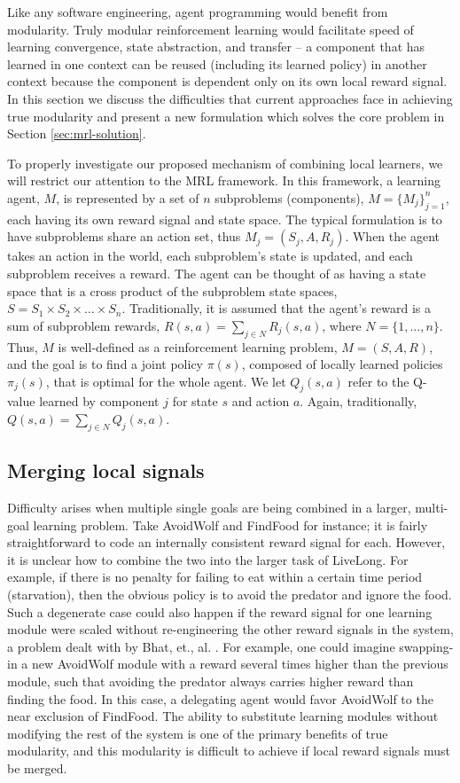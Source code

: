 Like any software engineering, agent programming would benefit from modularity.  Truly modular reinforcement learning would facilitate speed of learning convergence, state abstraction, and transfer -- a component that has learned in one context can be reused (including its learned policy) in another context because the component is dependent only on its own local reward signal.  In this section we discuss the difficulties that current approaches face in achieving true modularity and present a new formulation which solves the core problem in Section \ref{sec:mrl-solution}.

To properly investigate our proposed mechanism of combining local learners, we will restrict our attention to the MRL framework. In this framework, a learning agent, $M$, is represented by a set of $n$ subproblems (components), $M=\{M_j\}_{j=1}^n$, each having its own reward signal and state space. The typical formulation is to have subproblems share an action set, thus $M_j = (S_j,A,R_j)$. When the agent takes an action in the world, each subproblem's state is updated, and each subproblem receives a reward. The agent can be thought of as having a state space that is a cross product of the subproblem state spaces, $S=S_1\times S_2\times\ldots\times S_n$. Traditionally, it is assumed that the agent's reward is a sum of subproblem rewards, $R(s,a)=\sum_{j\in N} R_j(s,a)$, where $N=\{1,\ldots,n\}$. Thus, $M$ is well-defined as a reinforcement learning problem, $M=(S,A,R)$, and the goal is to find a joint policy $\pi(s)$, composed of locally learned policies $\pi_j(s)$, that is optimal for the whole agent. We let $Q_j(s,a)$ refer to the Q-value learned by component $j$ for state $s$ and action $a$. Again, traditionally, $Q(s,a)=\sum_{j\in N} Q_j(s,a)$.

\subsection{Merging local signals}

Difficulty arises when multiple single goals are being combined in a larger, multi-goal learning problem. Take AvoidWolf and FindFood for instance; it is fairly straightforward to code an internally consistent reward signal for each.  However, it is unclear how to combine the two into the larger task of LiveLong.  For example, if there is no penalty for failing to eat within a certain time period (starvation), then the obvious policy is to avoid the predator and ignore the food.  Such a degenerate case could also happen if the reward signal for one learning module were scaled without re-engineering the other reward signals in the system, a problem dealt with by Bhat, et., al. \cite{bhat2006on-the-difficulty}.  For example, one could imagine swapping-in a new AvoidWolf module with a reward several times higher than the previous module, such that avoiding the predator always carries higher reward than finding the food.  In this case, a delegating agent would favor AvoidWolf to the near exclusion of FindFood.  The ability to substitute learning modules without modifying the rest of the system is one of the primary benefits of true modularity, and this modularity is difficult to achieve if local reward signals must be merged.


